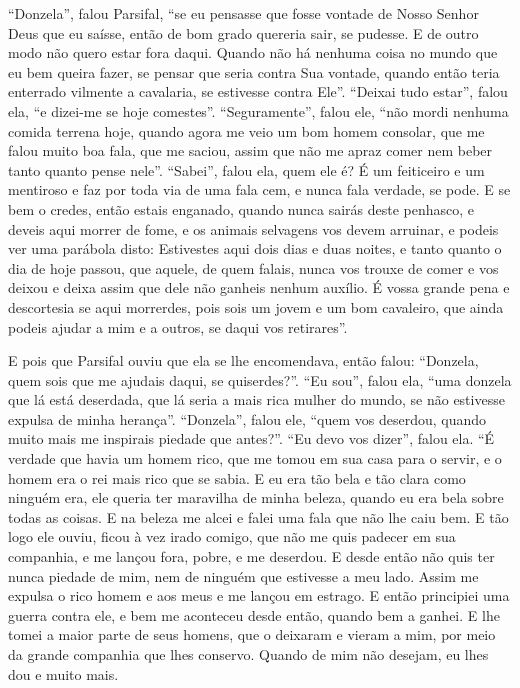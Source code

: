“Donzela”, falou Parsifal, “se eu pensasse que fosse vontade de Nosso
Senhor Deus que eu saísse, então de bom grado quereria sair, se pudesse. E de
outro modo não quero estar fora daqui. Quando não há nenhuma coisa no mundo que
eu bem queira fazer, se pensar que seria contra Sua vontade, quando então teria
enterrado vilmente a cavalaria, se estivesse contra Ele”. “Deixai tudo
estar”, falou ela, “e dizei-me se hoje comestes”. “Seguramente”, falou ele,
“não mordi nenhuma comida terrena hoje, quando agora me veio um bom homem
consolar, que me falou muito boa fala, que me saciou, assim que não me apraz
comer nem beber tanto quanto pense nele”. “Sabei”, falou ela, quem ele é? É um
feiticeiro e um mentiroso e faz por toda via de uma fala cem, e nunca fala
verdade, se pode. E se bem o credes, então estais enganado, quando nunca sairás
deste penhasco, e deveis aqui morrer de fome, e os animais selvagens vos devem
arruinar, e podeis ver uma parábola disto: Estivestes aqui dois dias e duas
noites, e tanto quanto o dia de hoje passou, que aquele, de quem falais, nunca
vos trouxe de comer e vos deixou  e deixa assim que dele não ganheis nenhum
auxílio. É vossa grande pena e descortesia se aqui morrerdes, pois sois um
jovem e um bom cavaleiro, que ainda podeis ajudar a mim e a outros, se daqui
vos retirares”.

E pois que Parsifal ouviu que ela se lhe encomendava, então falou:
“Donzela, quem sois que me ajudais daqui, se quiserdes?”. “Eu sou”, falou ela,
“uma donzela que lá está deserdada, que lá seria a mais rica mulher do mundo,
se não estivesse expulsa de minha herança”. “Donzela”, falou ele, “quem vos
deserdou, quando muito mais me inspirais piedade que antes?”. “Eu devo vos
dizer”, falou ela. “É verdade que havia um homem rico, que me tomou em sua casa
para o servir, e o homem era o rei mais rico que se sabia. E eu era tão bela e
tão clara como  ninguém era, ele queria ter maravilha de minha beleza, quando
eu era bela sobre todas as coisas. E na beleza me alcei e falei uma fala que
não lhe caiu bem. E tão logo ele ouviu, ficou à vez irado comigo, que não me
quis padecer em sua companhia, e me lançou fora, pobre, e me deserdou. E desde
então não quis ter nunca piedade de mim, nem de ninguém que estivesse a meu
lado. Assim me expulsa o rico homem e aos meus e me lançou em estrago. E então
principiei uma guerra contra ele, e bem me aconteceu desde então, quando bem a
ganhei. E lhe tomei a maior parte de seus homens, que o deixaram e vieram a
mim, por meio da grande companhia que lhes conservo. Quando de mim não desejam,
eu lhes dou e muito mais.

